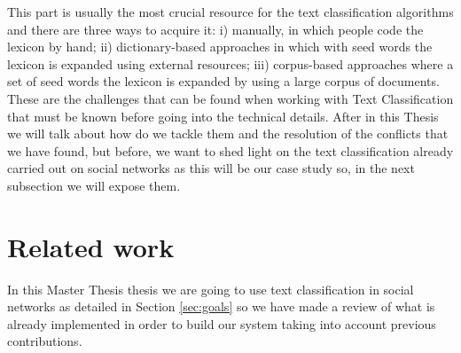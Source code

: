 

This part is usually the most crucial resource for the text classification algorithms and there are three ways to acquire it: i) manually, in which people code the lexicon by hand; ii) dictionary-based approaches in which with seed words the lexicon is expanded using external resources; iii) corpus-based approaches where a set of seed words the lexicon is expanded by using a large corpus of documents.\\

These are the challenges that can be found when working with Text Classification that must be known before going into the technical details. After in this Thesis we will talk about how do we tackle them and the resolution of the conflicts that we have found, but before, we want to shed light on the text classification already carried out on social networks as this will be our case study so, in the next subsection we will expose them.




\section{Related work}
\label{sec:studies}


In this Master Thesis thesis we are going to use text classification in social networks as detailed in Section \ref{sec:goals} so we have made a review of what is already implemented in order to build our system taking into account previous contributions.

